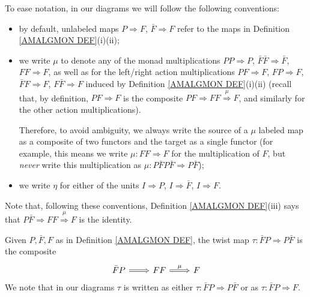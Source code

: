 \documentclass[a4paper,10pt
,draft
]{article}%
\renewcommand{\1}{\eta}%
\begin{document}
\begin{remark}\label{SHORTCONV REM}
To ease notation, in our diagrams we will follow the following conventions:
\begin{itemize}
\item by default, unlabeled maps
$P \Rightarrow F$, $\bar{F} \Rightarrow F$ refer to the maps in
Definition \ref{AMALGMON DEF}(i)(ii);
\item we write $\mu$ to denote any of the monad multiplications
$PP \Rightarrow P$,
$\bar{F}\bar{F} \Rightarrow \bar{F}$,
$FF \Rightarrow F$,
as well as for the left/right action multiplications
$PF \Rightarrow F$,
$FP \Rightarrow F$,
$\bar{F} F \Rightarrow F$,
$F \bar{F} \Rightarrow F$
induced by Definition \ref{AMALGMON DEF}(i)(ii)
(recall that, by definition,
$PF \Rightarrow F$ is the composite
$PF \Rightarrow FF \overset{\mu}{\Rightarrow} F$,
and similarly for the other action multiplications).

Therefore, to avoid ambiguity, we always write the 
source of a $\mu$ labeled map as a composite of two functors and the target as a single functor
(for example, this means we write 
$\mu\colon FF \Rightarrow F$ for the multiplication of $F$,
but \emph{never} write this multiplication as $\mu \colon P \bar{F} P \bar{F} \Rightarrow P \bar{F}$);
\item we write $\eta$ for either of the units 
$I \Rightarrow P$,
$I \Rightarrow \bar{F}$,
$I \Rightarrow F$.
\end{itemize}
Note that, following these conventions, 
Definition \ref{AMALGMON DEF}(iii)
says that 
$P\bar{F} \Rightarrow FF \overset{\mu}{\Rightarrow} F$
is the identity.
\end{remark}


\begin{definition}\label{TWISTMAP DEF}
Given $P,\bar{F},F$ as in Definition \ref{AMALGMON DEF}, 
the twist map $\tau \colon \bar{F} P \Rightarrow P \bar{F}$ is the composite
\[
\begin{tikzcd}
	\bar{F} P \ar[Rightarrow]{r}{}
&
	FF  \ar[Rightarrow]{r}{\mu}
&
	F 
\end{tikzcd}
\]
We note that in our diagrams $\tau$ is written as either
$\tau \colon \bar{F} P \Rightarrow P \bar{F}$ or as
$\tau \colon \bar{F} P \Rightarrow F$.
\end{definition}
\end{document}

